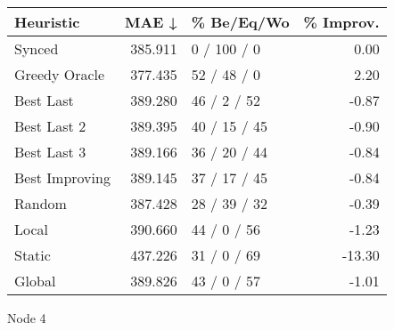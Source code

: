 \begin{tabular}{lrlr}
\toprule
\textbf{Heuristic} & \textbf{MAE ↓} & \textbf{\% Be/Eq/Wo} & \textbf{\% Improv.} \\
\midrule
            Synced &        385.911 &          0 / 100 / 0 &                0.00 \\
     Greedy Oracle &        377.435 &          52 / 48 / 0 &                2.20 \\
         Best Last &        389.280 &          46 / 2 / 52 &               -0.87 \\
       Best Last 2 &        389.395 &         40 / 15 / 45 &               -0.90 \\
       Best Last 3 &        389.166 &         36 / 20 / 44 &               -0.84 \\
    Best Improving &        389.145 &         37 / 17 / 45 &               -0.84 \\
            Random &        387.428 &         28 / 39 / 32 &               -0.39 \\
             Local &        390.660 &          44 / 0 / 56 &               -1.23 \\
            Static &        437.226 &          31 / 0 / 69 &              -13.30 \\
            Global &        389.826 &          43 / 0 / 57 &               -1.01 \\
\bottomrule
\end{tabular}
\caption{Node 4}
\label{tab:non_lr05_le2_bs2_4}
